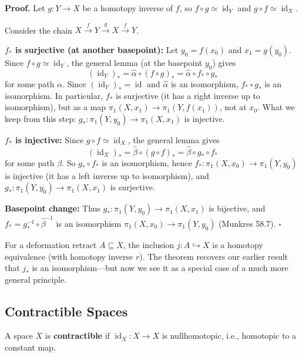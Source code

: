 \documentclass[11pt]{report}
\renewenvironment{proof}[1][Proof]{\noindent\textbf{#1.} }{\hfill$\square$\par\vspace{5pt}}
\begin{document}
\begin{proof}
Let $g: Y \to X$ be a homotopy inverse of $f$, so $f \circ g \simeq \operatorname{id}_Y$ and $g \circ f \simeq \operatorname{id}_X$.

Consider the chain $X \xrightarrow{f} Y \xrightarrow{g} X \xrightarrow{f} Y$.

\textbf{$f_*$ is surjective (at another basepoint):} Let $y_0 = f(x_0)$ and $x_1 = g(y_0)$. Since $f \circ g \simeq \operatorname{id}_Y$, the general lemma (at the basepoint $y_0$) gives
\[(\operatorname{id}_Y)_* = \hat{\alpha} \circ (f \circ g)_* = \hat{\alpha} \circ f_* \circ g_*\]
for some path $\alpha$. Since $(\operatorname{id}_Y)_* = \operatorname{id}$ and $\hat{\alpha}$ is an isomorphism, $f_* \circ g_*$ is an isomorphism. In particular, $f_*$ is surjective (it has a right inverse up to isomorphism), but as a map $\pi_1(X, x_1) \to \pi_1(Y, f(x_1))$, not at $x_0$. What we keep from this step: $g_*: \pi_1(Y, y_0) \to \pi_1(X, x_1)$ is injective.

\textbf{$f_*$ is injective:} Since $g \circ f \simeq \operatorname{id}_X$, the general lemma gives
\[(\operatorname{id}_X)_* = \hat{\beta} \circ (g \circ f)_* = \hat{\beta} \circ g_* \circ f_*\]
for some path $\beta$. So $g_* \circ f_*$ is an isomorphism, hence $f_*: \pi_1(X, x_0) \to \pi_1(Y, y_0)$ is injective (it has a left inverse up to isomorphism), and $g_*: \pi_1(Y, y_0) \to \pi_1(X, x_1)$ is surjective.

\textbf{Basepoint change:} Thus $g_*: \pi_1(Y, y_0) \to \pi_1(X, x_1)$ is bijective, and $f_* = g_*^{-1} \circ \hat{\beta}^{-1}$ is an isomorphism $\pi_1(X, x_0) \to \pi_1(Y, y_0)$ (Munkres 58.7).
\end{proof}

\begin{rembox}
For a deformation retract $A \subseteq X$, the inclusion $j: A \hookrightarrow X$ is a homotopy equivalence (with homotopy inverse $r$). The theorem recovers our earlier result that $j_*$ is an isomorphism---but now we see it as a special case of a much more general principle.
\end{rembox}

\subsection{Contractible Spaces}

\begin{defbox}
A space $X$ is \textbf{contractible} if $\operatorname{id}_X: X \to X$ is nullhomotopic, i.e., homotopic to a constant map.
\end{defbox}
\end{document}
